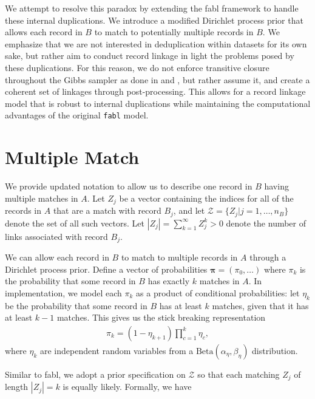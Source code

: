 \documentclass[12pt,letterpaper]{article}
\newcommand{\1}[1]{\mathbb{I}\!\left[#1\right]} %
\begin{document}
We attempt to resolve this paradox by extending the fabl framework to handle these internal duplications. We introduce a modified Dirichlet process prior that allows each record in $B$ to match to potentially multiple records in $B$. We emphasize that we are not interested in deduplication within datasets for its own sake, but rather aim to conduct record linkage in light the problems posed by these duplications. For this reason, we do not enforce transitive closure throughout the Gibbs sampler as done in \cite{marchant_distributed_2019} and \cite{aleshinguendel2021multifile}, but rather assume it, and create a coherent set of linkages through post-processing. This allows for a record linkage model that is robust to internal duplications while maintaining the computational advantages of the original \texttt{fabl} model. 

\section{Multiple Match}

We provide updated notation to allow us to describe one record in $B$ having multiple matches in $A$. Let $Z_j$ be a vector containing the indices for all of the records in $A$ that are a match with record $B_j$, and let $\mathcal{Z} = \{Z_j | j = 1, \ldots, n_B\}$ denote the set of all such vectors. Let $|Z_j| = \sum_{k=1}^{\infty} Z_j^k > 0$ denote the number of links associated with record $B_j$. 

We can allow each record in $B$ to match to multiple records in $A$ through a Dirichlet process prior. Define a vector of probabilities $\bm{\pi} = (\pi_0, \ldots)$ where $\pi_k$ is the probability that some record in $B$ has exactly $k$ matches in $A$. In implementation, we model each $\pi_k$ as a product of conditional probabilities: let $\eta_k$ be the probability that some record in $B$ has at least $k$ matches, given that it has at least $k-1$ matches. This gives us the stick breaking representation
\begin{align}
	\pi_k = (1 - \eta_{k+1}) \prod_{c=1}^{k} \eta_c, 
\end{align}
where $\eta_k$ are independent random variables from a $\text{Beta}(\alpha_{\eta}, \beta_{\eta})$ distribution.

Similar to fabl, we adopt a prior specification on $\mathcal{Z}$ so that each matching $Z_j$ of length $|Z_j| = k$ is equally likely. Formally, we have
\end{document}
